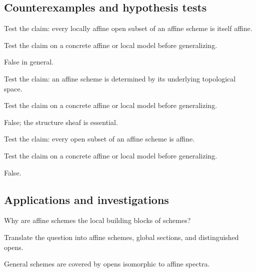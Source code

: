 \subsection*{Counterexamples and hypothesis tests}

\begin{exercise}\label{exr:vi18-expand-10}
Test the claim: every locally affine open subset of an affine scheme is itself affine.
\end{exercise}
\begin{hint}
Test the claim on a concrete affine or local model before generalizing.
\end{hint}
\begin{solution}
False in general.
\end{solution}

\begin{exercise}\label{exr:vi18-expand-11}
Test the claim: an affine scheme is determined by its underlying topological space.
\end{exercise}
\begin{hint}
Test the claim on a concrete affine or local model before generalizing.
\end{hint}
\begin{solution}
False; the structure sheaf is essential.
\end{solution}

\begin{exercise}\label{exr:vi18-expand-12}
Test the claim: every open subset of an affine scheme is affine.
\end{exercise}
\begin{hint}
Test the claim on a concrete affine or local model before generalizing.
\end{hint}
\begin{solution}
False.
\end{solution}

\subsection*{Applications and investigations}

\begin{exercise}\label{exr:vi18-expand-13}
Why are affine schemes the local building blocks of schemes?
\end{exercise}
\begin{hint}
Translate the question into affine schemes, global sections, and distinguished opens.
\end{hint}
\begin{solution}
General schemes are covered by opens isomorphic to affine spectra.
\end{solution}


